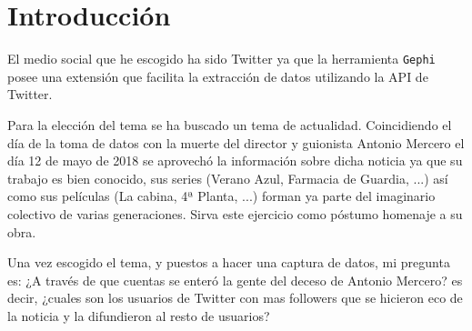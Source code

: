 \chapter{Introducción}

El medio social que he escogido ha sido Twitter ya que la herramienta \texttt{Gephi} posee una extensión que facilita la extracción de datos utilizando la API de Twitter.

\bigskip
Para la elección del tema se ha buscado un tema de actualidad. Coincidiendo el día de la toma de datos con la muerte del director y guionista Antonio Mercero el día 12 de mayo de 2018 se aprovechó la información sobre dicha noticia ya que su trabajo es bien conocido, sus series (Verano Azul, Farmacia de Guardia, ...) así como sus películas (La cabina, 4ª Planta, ...) forman ya parte del imaginario colectivo de varias generaciones. Sirva este ejercicio como póstumo homenaje a su obra.

\bigskip
Una vez escogido el tema, y puestos a hacer una captura de datos, mi pregunta es: ¿A través de que cuentas se enteró la gente del deceso de Antonio Mercero? es decir, ¿cuales son los usuarios de Twitter con mas followers que se hicieron eco de la noticia y la difundieron al resto de usuarios?
